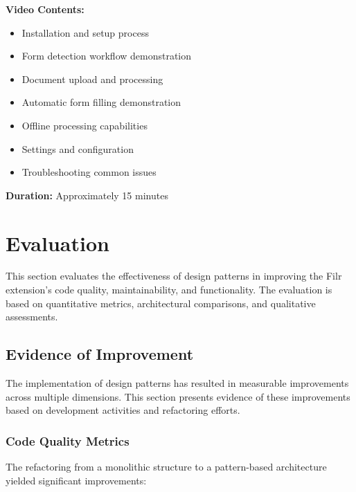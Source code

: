 \documentclass[11pt, a4paper]{article}
\theoremstyle{plain}
\theoremstyle{definition}
\begin{document}
\textbf{Video Contents:}
\begin{itemize}
    \item Installation and setup process
    \item Form detection workflow demonstration
    \item Document upload and processing
    \item Automatic form filling demonstration
    \item Offline processing capabilities
    \item Settings and configuration
    \item Troubleshooting common issues
\end{itemize}

\textbf{Duration:} Approximately 15 minutes

\newpage
\section{Evaluation}

This section evaluates the effectiveness of design patterns in improving the Filr extension's code quality, maintainability, and functionality. The evaluation is based on quantitative metrics, architectural comparisons, and qualitative assessments.

\subsection{Evidence of Improvement}

The implementation of design patterns has resulted in measurable improvements across multiple dimensions. This section presents evidence of these improvements based on development activities and refactoring efforts.

\subsubsection{Code Quality Metrics}

The refactoring from a monolithic structure to a pattern-based architecture yielded significant improvements:
\end{document}
